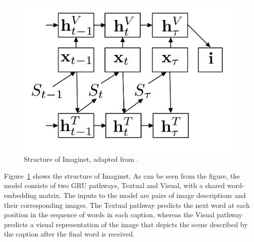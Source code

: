 \begin{figure}
\begin{center}
\includegraphics[scale=0.2]{imaginet.pdf} 
\caption{Structure of {\sc Imaginet}, adapted from \protect\cite{chrupala2015learning}.}
\label{fig:imaginet}
\end{center}
\end{figure}

Figure~\ref{fig:imaginet} shows the structure of {\sc Imaginet}. As can
be seen from the figure, the model consists of two GRU pathways, 
{\sc Textual} and {\sc Visual}, with a shared word-embedding matrix. 
The inputs to the model are pairs of image descriptions and their 
corresponding images. The {\sc Textual} pathway predicts the next 
word at each position in the sequence of words in each caption, whereas the 
{\sc Visual} pathway predicts a visual representation of the image that depicts the 
scene described by the caption after the final word is received.

